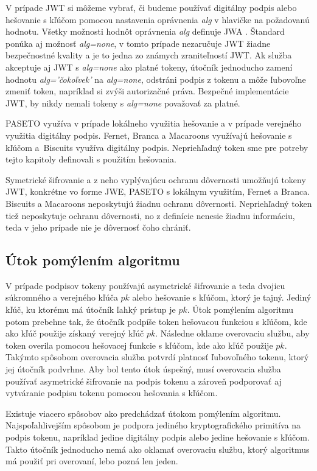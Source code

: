 V prípade JWT si môžeme vybrať, či budeme používať digitálny podpis alebo hešovanie s kľúčom pomocou nastavenia oprávnenia \textit{alg} v hlavičke na požadovanú hodnotu. Všetky možnosti hodnôt oprávnenia \textit{alg} definuje  JWA \cite{jwa_rfc}. Štandard ponúka aj možnosť \textit{alg=none}, v tomto prípade nezaručuje JWT žiadne bezpečnostné kvality a je to jedna zo známych zraniteľností \cite{jwt_vul} JWT. Ak služba akceptuje aj JWT s \textit{alg=none} ako platné tokeny, útočník jednoducho zamení hodnotu \textit{alg='čokoľvek'} na \textit{alg=none}, odstráni podpis z tokenu a môže ľubovoľne zmeniť token, napríklad si zvýši autorizačné práva. Bezpečné implementácie JWT, by nikdy nemali tokeny s \textit{alg=none} považovať za platné.

PASETO využíva v prípade lokálneho využitia hešovanie a v prípade verejného využitia digitálny podpis. Fernet, Branca a Macaroons využívajú hešovanie s kľúčom a~Biscuits využíva digitálny podpis. Nepriehľadný token sme pre potreby tejto kapitoly definovali s použitím hešovania.

Symetrické šifrovanie a z neho vyplývajúcu ochranu dôvernosti umožňujú tokeny JWT, konkrétne vo forme JWE, PASETO s lokálnym využitím, Fernet a Branca. Biscuits a Macaroons neposkytujú žiadnu ochranu dôvernosti. Nepriehľadný token tiež neposkytuje ochranu dôvernosti, no z definície nenesie žiadnu informáciu, teda v jeho prípade nie je dôvernosť čoho chrániť.

\subsection{Útok pomýlením algoritmu}

V prípade podpisov tokeny používajú asymetrické šifrovanie a teda dvojicu súkromného a verejného kľúča $pk$ alebo hešovanie s kľúčom, ktorý je tajný. Jediný kľúč, ku ktorému má útočník ľahký prístup je $pk$. Útok pomýlením algoritmu potom prebehne tak, že útočník podpíše token hešovacou funkciou s kľúčom, kde ako kľúč použije získaný verejný kľúč $pk$. Následne oklame overovaciu službu, aby token overila pomocou hešovacej funkcie s kľúčom, kde ako kľúč použije $pk$. Takýmto spôsobom overovacia služba potvrdí platnosť ľubovoľného tokenu, ktorý jej útočník podvrhne. Aby bol tento útok úspešný, musí overovacia služba používať asymetrické šifrovanie na podpis tokenu a zároveň podporovať aj vytváranie podpisu tokenu pomocou hešovania s kľúčom.

Existuje viacero spôsobov ako predchádzať útokom pomýlením algoritmu. Najspoľahlivejším spôsobom je podpora jediného kryptografického primitíva na podpis tokenu, napríklad jedine digitálny podpis alebo jedine hešovanie s kľúčom. Takto útočník jednoducho nemá ako oklamať overovaciu službu, ktorý algoritmus má použiť pri overovaní, lebo pozná len jeden. 

